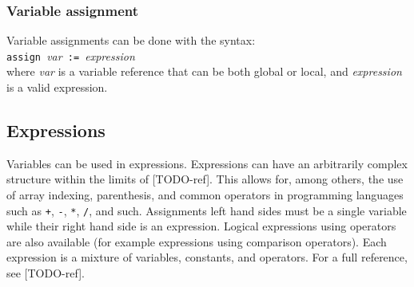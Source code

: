   \subsubsection{Variable assignment}
Variable assignments can be done with the syntax: \\\verb!assign !\textit{var}\verb! := !\textit{expression}\\ where \textit{var} is a variable reference that can be both global or local, and \textit{expression} is a valid expression.
  \subsection{Expressions}
Variables can be used in expressions. Expressions can have an arbitrarily complex structure within the limits of [TODO-ref]. This allows for, among others, the use of array indexing, parenthesis, and common operators in programming languages such as \verb!+!, \verb!-!, \verb!*!, \verb!/!, and such. Assignments left hand sides must be a single variable while their right hand side is an expression. Logical expressions using operators are also available (for example expressions using comparison operators). Each expression is a mixture of variables, constants, and operators. For a full reference, see [TODO-ref].
